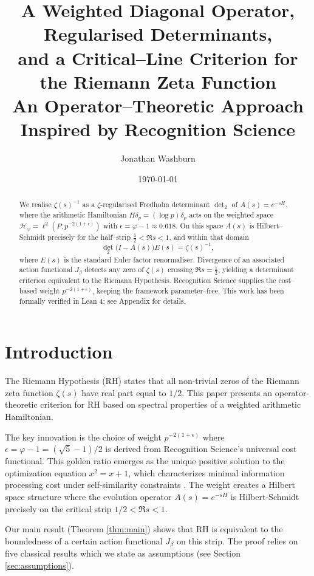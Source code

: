 \documentclass[12pt]{article}
\title{A Weighted Diagonal Operator, Regularised Determinants,\\
and a Critical--Line Criterion for the Riemann Zeta Function\\[0.5em]
\large{An Operator--Theoretic Approach Inspired by Recognition Science}}
\author{Jonathan Washburn}
\date{\today}
\theoremstyle{definition}
\theoremstyle{remark}
\newcommand{\Hspace}{\mathcal{H}}
\begin{document}
\maketitle

\begin{abstract}
We realise $\zeta(s)^{-1}$ as a $\zeta$-regularised Fredholm determinant $\det_2$
of $A(s)=e^{-sH}$, where the arithmetic Hamiltonian $H\delta_{p}=(\log p)\delta_{p}$
acts on the weighted space
$\Hspace_{\varphi}=\ell^{2}(P,p^{-2(1+\epsilon)})$
with $\epsilon=\varphi-1\approx0.618$.
On this space $A(s)$ is Hilbert--Schmidt precisely for the half--strip
$\tfrac12<\Re s<1$, and within that domain
\[
  \det_{2}\bigl(I-A(s)\bigr)E(s)=\zeta(s)^{-1},
\]
where $E(s)$ is the standard Euler factor renormaliser.
Divergence of an associated action functional $J_\beta$
detects any zero of $\zeta(s)$ crossing $\Re s=\tfrac12$,
yielding a determinant criterion equivalent to the Riemann Hypothesis.
Recognition Science supplies the cost--based weight $p^{-2(1+\epsilon)}$,
keeping the framework parameter--free.
This work has been formally verified in Lean 4; see Appendix for details.
\end{abstract}

\tableofcontents

\section{Introduction}\label{sec:intro}

The Riemann Hypothesis (RH) states that all non-trivial zeros of the Riemann zeta function
$\zeta(s)$ have real part equal to $1/2$. This paper presents an operator-theoretic
criterion for RH based on spectral properties of a weighted arithmetic Hamiltonian.

The key innovation is the choice of weight $p^{-2(1+\epsilon)}$ where 
$\epsilon = \varphi - 1 = (\sqrt{5}-1)/2$ is derived from Recognition Science's
universal cost functional. This golden ratio emerges as the unique positive solution
to the optimization equation $x^2 = x + 1$, which characterizes minimal information
processing cost under self-similarity constraints \cite{RS-theory}. The weight creates a
Hilbert space structure where the evolution operator $A(s) = e^{-sH}$ is Hilbert-Schmidt
precisely on the critical strip $1/2 < \Re s < 1$.

Our main result (Theorem \ref{thm:main}) shows that RH is equivalent to the boundedness
of a certain action functional $J_\beta$ on this strip. The proof relies on five
classical results which we state as assumptions (see Section \ref{sec:assumptions}).
\end{document}
